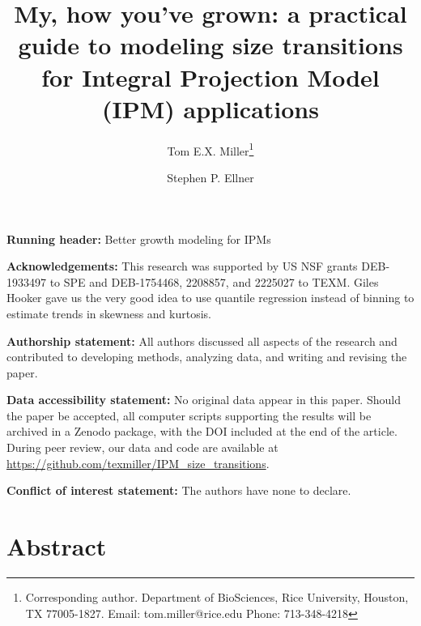 \documentclass[12pt]{article}
\title{My, how you've grown: a practical guide to modeling size transitions for Integral Projection Model (IPM) applications}
\author[a]{Tom E.X. Miller\thanks{Corresponding author. Department of BioSciences, Rice University,
Houston, TX 77005-1827. Email: tom.miller@rice.edu Phone: 713-348-4218}}
\author[b]{Stephen P. Ellner}
\affil[a]{Department of BioSciences, Rice University, Houston TX }
\affil[b]{Department of Ecology \& Evolutionary Biology, Cornell University, Ithaca NY}
\date{}
\begin{document}
\renewcommand{\baselinestretch}{1.2} 
\maketitle

\bigskip 
\noindent\textbf{Running header:} Better growth modeling for IPMs

\bigskip 
\noindent\textbf{Acknowledgements:} This research was supported by US NSF grants DEB-1933497 to SPE and DEB-1754468, 2208857, and 2225027 to TEXM. Giles Hooker gave us the very good idea to use 
quantile regression instead of binning to estimate trends in skewness and kurtosis. 

\bigskip 
\noindent\textbf{Authorship statement:} All authors discussed all aspects of the research and contributed to developing methods, analyzing data, and writing and revising the paper.  

\bigskip 
\noindent\textbf{Data accessibility statement:} No original data appear in this paper. Should the paper be accepted, all computer scripts supporting the results will be archived in a Zenodo package, with the DOI included at the end of the article. During peer review, our data and code are available at \url{https://github.com/texmiller/IPM_size_transitions}. 

\bigskip 
\noindent\textbf{Conflict of interest statement:} The authors have none to declare. 

\newpage
\linenumbers
\section*{Abstract} 
\end{document}
